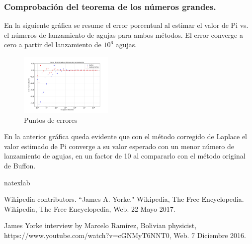 \documentclass{rbf}
\begin{document}
\subsubsection{Comprobación del teorema de los números grandes.}
En la siguiente gráfica se resume el error porcentual al estimar el valor de Pi vs. el números de lanzamiento de agujas para ambos métodos. El error converge a cero a partir del lanzamiento de $10^6$ agujas.
\begin{figure}[tbp!]
 \centering
  \includegraphics[width=0.4\textwidth]{figures/Errores.jpg}
	\caption{Puntos de errores}
 \label{buff}
\end{figure}
En la anterior gráfica queda evidente que con el método corregido de Laplace el valor estimado de Pi converge a su valor esperado con un menor número de lanzamiento de agujas, en un factor de 10 al compararlo con el método original de Buffon. 

\begin{thebibliography}{32}
\expandafter\ifx\csname natexlab\endcsname\relax\def\natexlab#1{#1}\fi


Wikipedia contributors. ``James A. Yorke." Wikipedia, The Free Encyclopedia. Wikipedia, The Free Encyclopedia, Web. 22 Mayo 2017.



James Yorke interview by Marcelo Ramírez, Bolivian physicist, https://www.youtube.com/watch?v=cGNMyT6NNT0, Web. 7 Diciembre 2016.
\end{thebibliography}
\end{document}
